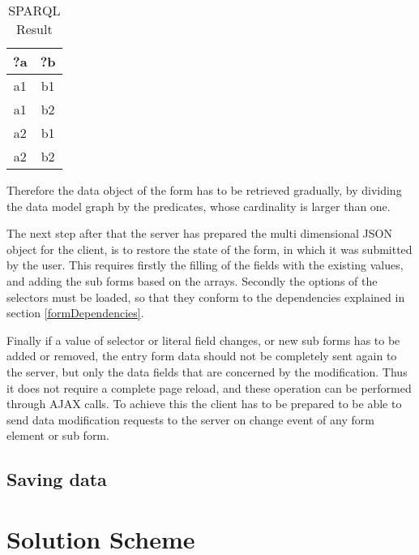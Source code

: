 \begin{table}

	\begin{center}
		\begin{tabular}{||c | c||} 
			\hline
			?a & ?b  \\ [0.5ex] 
			\hline\hline
			a1 & b1 \\ 
			\hline
			a1 & b2 \\
			\hline
			a2 & b1 \\
			\hline
			a2 & b2 \\ [1ex] 
			\hline 
		\end{tabular}
	\end{center}
	\caption{SPARQL Result}  \label{sparqlResult}
\end{table}


Therefore the data object of the form has to be retrieved gradually, by dividing the data model graph by the predicates, whose cardinality is larger than one.

The next step after that the server has prepared the multi dimensional JSON object for the client, is to restore the state of the form, in which it was submitted by the user. This requires firstly the filling of the fields with the existing values, and adding the sub forms based on the arrays. Secondly the options of the selectors must be loaded, so that they conform to the dependencies explained in section \ref{formDependencies}. 

Finally if a value of selector or literal field changes, or new sub forms has to be added or removed, the entry form data should not be completely sent again to the server, but only the data fields that are concerned by the modification. Thus it does not require a complete page reload, and these operation can be performed through AJAX calls. To achieve this the client has to be prepared to be able to send data modification requests to the server on change event of any form element or sub form.

\subsection{Saving data}




\section{Solution Scheme} \label{33}








